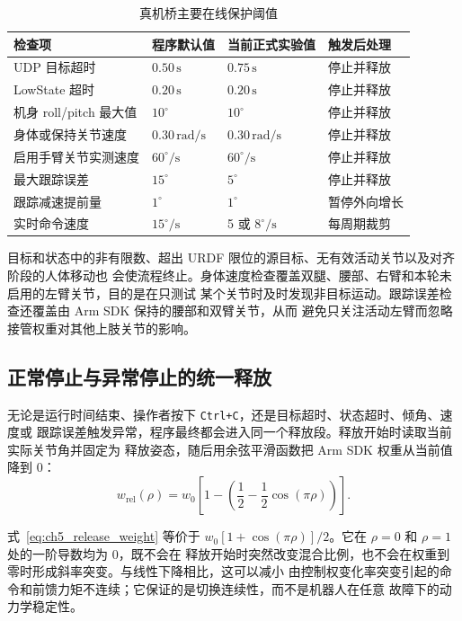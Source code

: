 \begin{table}[htbp]
  \centering
  \caption{真机桥主要在线保护阈值}
  \label{tab:ch5_safety_thresholds}
  \begin{tabularx}{\linewidth}{@{}Xlll@{}}
    \toprule
    检查项 & 程序默认值 & 当前正式实验值 & 触发后处理 \\
    \midrule
    UDP 目标超时 & $0.50\,\mathrm s$ & $0.75\,\mathrm s$ & 停止并释放 \\
    LowState 超时 & $0.20\,\mathrm s$ & $0.20\,\mathrm s$ & 停止并释放 \\
    机身 roll/pitch 最大值 & $10^\circ$ & $10^\circ$ & 停止并释放 \\
    身体或保持关节速度 & $0.30\,\mathrm{rad/s}$ & $0.30\,\mathrm{rad/s}$ & 停止并释放 \\
    启用手臂关节实测速度 & $60^\circ/\mathrm s$ & $60^\circ/\mathrm s$ & 停止并释放 \\
    最大跟踪误差 & $15^\circ$ & $5^\circ$ & 停止并释放 \\
    跟踪减速提前量 & $1^\circ$ & $1^\circ$ & 暂停外向增长 \\
    实时命令速度 & $15^\circ/\mathrm s$ & 5 或 $8^\circ/\mathrm s$ & 每周期裁剪 \\
    \bottomrule
  \end{tabularx}
\end{table}

目标和状态中的非有限数、超出 URDF 限位的源目标、无有效活动关节以及对齐阶段的人体移动也
会使流程终止。身体速度检查覆盖双腿、腰部、右臂和本轮未启用的左臂关节，目的是在只测试
某个关节时及时发现非目标运动。跟踪误差检查还覆盖由 Arm SDK 保持的腰部和双臂关节，从而
避免只关注活动左臂而忽略接管权重对其他上肢关节的影响。

\subsection{正常停止与异常停止的统一释放}
\label{subsec:ch5_smooth_release}

无论是运行时间结束、操作者按下 \texttt{Ctrl+C}，还是目标超时、状态超时、倾角、速度或
跟踪误差触发异常，程序最终都会进入同一个释放段。释放开始时读取当前实际关节角并固定为
释放姿态，随后用余弦平滑函数把 Arm SDK 权重从当前值降到 0：
\begin{equation}
  w_{\mathrm{rel}}(\rho)=w_0
  \left[1-\left(\frac12-\frac12\cos(\pi\rho)\right)\right].
  \label{eq:ch5_release_weight}
\end{equation}

式~\eqref{eq:ch5_release_weight} 等价于
$w_0[1+\cos(\pi\rho)]/2$。它在 $\rho=0$ 和 $\rho=1$ 处的一阶导数均为 0，既不会在
释放开始时突然改变混合比例，也不会在权重到零时形成斜率突变。与线性下降相比，这可以减小
由控制权变化率突变引起的命令和前馈力矩不连续；它保证的是切换连续性，而不是机器人在任意
故障下的动力学稳定性。

